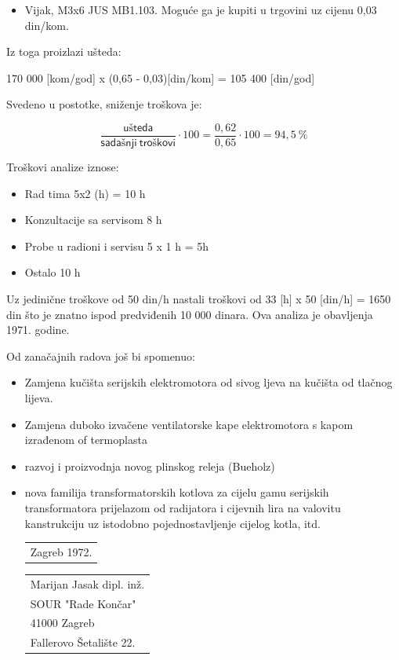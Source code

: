\documentclass[a4paper,12pt]{article}
\numberwithin{figure}{section}
\begin{document}
\begin{itemize}
\item Vijak, M3x6 JUS MB1.103. Moguće ga je kupiti u trgovini uz cijenu 0,03 din/kom.
\end{itemize}
\begin{figure}
  \vspace{-20pt}
  \begin{center}
    
  \end{center}

\end{figure}
\FloatBarrier
Iz toga proizlazi ušteda:
\begin{center}
170 000 [kom/god] x (0,65 - 0,03)[din/kom] = 105 400 [din/god]
\end{center}
Svedeno u postotke, sniženje troškova je:
\begin{center}
\begin{equation*}
\frac{\mathsf{ušteda}}{\mathsf{sadašnji\: troškovi}} \cdot 100 = \frac{0,62}{0,65} \cdot 100 = 94,5\:
\%
\end{equation*}
\end{center}
Troškovi analize iznose:
\begin{itemize}
\item Rad tima 5x2 (h) = 10 h
\item Konzultacije sa servisom 8 h
\item Probe u radioni i servisu 5 x 1 h = 5h
\item Ostalo 10 h
\end{itemize}
Uz jedinične troškove od 50 din/h nastali troškovi od 33 [h] x 50 [din/h] = 1650 din što je znatno ispod predviđenih 10 000 dinara. Ova analiza je obavljenja 1971. godine.\par
Od zanačajnih radova još bi spomenuo:
\begin{itemize}
\item Zamjena kučišta serijskih elektromotora od sivog ljeva na kučišta od tlačnog lijeva. 
\item Zamjena duboko izvačene ventilatorske kape elektromotora s kapom izrađenom of termoplasta
\item razvoj i proizvodnja novog plinskog releja (Bueholz)
\item nova familija transformatorskih kotlova za cijelu gamu serijskih transformatora prijelazom od radijatora i cijevnih lira na valovitu kanstrukciju uz istodobno pojednostavljenje cijelog kotla, itd.\\


\vfill\noindent
\begin{tabular}[t]{@{}l} 
  Zagreb 1972.
\end{tabular}
\hfill%
\begin{tabular}[t]{l@{}}
Marijan Jasak dipl. inž.\\
SOUR "Rade Končar"\\
41000 Zagreb\\
Fallerovo Šetalište 22.
\end{tabular}

\end{itemize}
\end{document}
